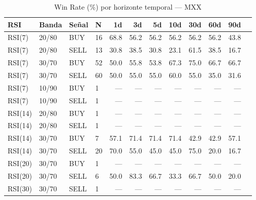 %
\begin{table}[htbp]
    \centering
    \caption{Win Rate (\%) por horizonte temporal --- MXX}
    \label{tab:winrate_mxx}
    \small
    \begin{tabular}{llllrrrrrrrr}
        \toprule
        \textbf{RSI} & \textbf{Banda} & \textbf{Se\~{n}al} & \textbf{N} & \textbf{1d} & \textbf{3d} & \textbf{5d} & \textbf{10d} & \textbf{30d} & \textbf{60d} & \textbf{90d} \\
        \midrule
        RSI(7) & 20/80 & BUY & 16 & 68.8 & 56.2 & 56.2 & 56.2 & 56.2 & 56.2 & 43.8 \\
        RSI(7) & 20/80 & SELL & 13 & 30.8 & 38.5 & 30.8 & 23.1 & 61.5 & 38.5 & 16.7 \\
        RSI(7) & 30/70 & BUY & 52 & 50.0 & 55.8 & 53.8 & 67.3 & 75.0 & 66.7 & 66.7 \\
        RSI(7) & 30/70 & SELL & 60 & 50.0 & 55.0 & 55.0 & 60.0 & 55.0 & 35.0 & 31.6 \\
        RSI(7) & 10/90 & BUY & 1 & --- & --- & --- & --- & --- & --- & --- \\
        RSI(7) & 10/90 & SELL & 1 & --- & --- & --- & --- & --- & --- & --- \\
        \midrule
        RSI(14) & 20/80 & BUY & 1 & --- & --- & --- & --- & --- & --- & --- \\
        RSI(14) & 20/80 & SELL & 1 & --- & --- & --- & --- & --- & --- & --- \\
        RSI(14) & 30/70 & BUY & 7 & 57.1 & 71.4 & 71.4 & 71.4 & 42.9 & 42.9 & 57.1 \\
        RSI(14) & 30/70 & SELL & 20 & 70.0 & 55.0 & 45.0 & 45.0 & 75.0 & 20.0 & 16.7 \\
        \midrule
        RSI(20) & 30/70 & BUY & 1 & --- & --- & --- & --- & --- & --- & --- \\
        RSI(20) & 30/70 & SELL & 6 & 50.0 & 83.3 & 66.7 & 33.3 & 66.7 & 50.0 & 20.0 \\
        \midrule
        RSI(30) & 30/70 & SELL & 1 & --- & --- & --- & --- & --- & --- & --- \\
        \bottomrule
    \end{tabular}
\end{table}
